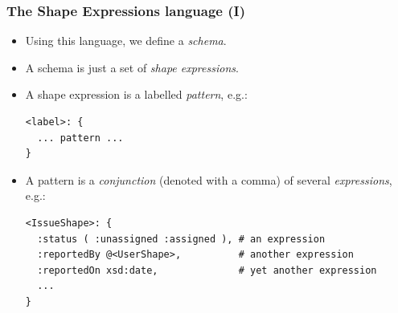 \documentclass{beamer}
\begin{document}
\begin{frame}[fragile]
  \frametitle{The Shape Expressions language (I)}

  \begin{itemize}
    \item Using this language, we define a \textit{schema}.

    \pause

    \item A schema is just a set of \textit{shape expressions}.

    \pause

    \item A shape expression is a labelled \textit{pattern}, e.g.:

    \begin{Verbatim}[fontsize=\scriptsize]
<label>: {
  ... pattern ...
}
    \end{Verbatim}

    \pause

    \item A pattern is a \textit{conjunction} (denoted with a comma) of several
      \textit{expressions}, e.g.:

    \begin{Verbatim}[fontsize=\scriptsize]
<IssueShape>: {
  :status ( :unassigned :assigned ), # an expression
  :reportedBy @<UserShape>,          # another expression
  :reportedOn xsd:date,              # yet another expression
  ...
}
    \end{Verbatim}

  \end{itemize}
\end{frame}
\end{document}
